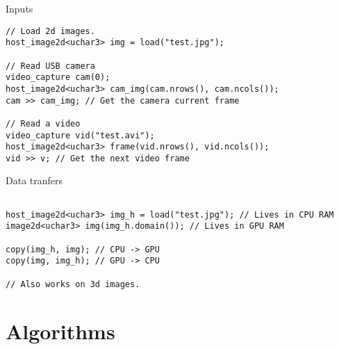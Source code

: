 \documentclass{beamer}
\begin{document}
\begin{frame}[containsverbatim]{Inputs}
\begin{lstlisting}
// Load 2d images.
host_image2d<uchar3> img = load("test.jpg");

// Read USB camera
video_capture cam(0);
host_image2d<uchar3> cam_img(cam.nrows(), cam.ncols());
cam >> cam_img; // Get the camera current frame

// Read a video
video_capture vid("test.avi");
host_image2d<uchar3> frame(vid.nrows(), vid.ncols());
vid >> v; // Get the next video frame
\end{lstlisting}
\end{frame}

\begin{frame}[containsverbatim]{Data tranfers}
\begin{lstlisting}

host_image2d<uchar3> img_h = load("test.jpg"); // Lives in CPU RAM
image2d<uchar3> img(img_h.domain()); // Lives in GPU RAM

copy(img_h, img); // CPU -> GPU
copy(img, img_h); // GPU -> CPU

// Also works on 3d images.
\end{lstlisting}
\end{frame}


\section{Algorithms}
\end{document}
